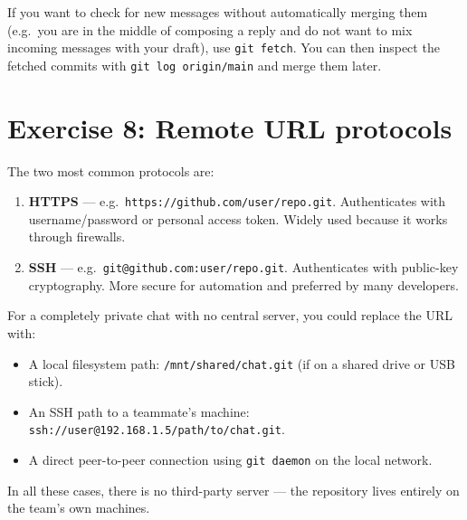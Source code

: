 \documentclass[twoside=false,DIV=14]{scrartcl}
\begin{document}
If you want to check for new messages without automatically merging them (e.g.\ you are in the middle of composing a reply and do not want to mix incoming messages with your draft), use \texttt{git fetch}.  You can then inspect the fetched commits with \texttt{git log origin/main} and merge them later.

\section*{Exercise 8: Remote URL protocols}

The two most common protocols are:

\begin{enumerate}
    \item \textbf{HTTPS} --- e.g.\ \texttt{https://github.com/user/repo.git}.  Authenticates with username/password or personal access token.  Widely used because it works through firewalls.
    \item \textbf{SSH} --- e.g.\ \texttt{git@github.com:user/repo.git}.  Authenticates with public-key cryptography.  More secure for automation and preferred by many developers.
\end{enumerate}

For a completely private chat with no central server, you could replace the URL with:
\begin{itemize}
\item A local filesystem path: \texttt{/mnt/shared/chat.git} (if on a shared drive or USB stick).
\item An SSH path to a teammate's machine: \texttt{ssh://user@192.168.1.5/path/to/chat.git}.
\item A direct peer-to-peer connection using \texttt{git daemon} on the local network.
\end{itemize}
In all these cases, there is no third-party server --- the repository lives entirely on the team's own machines.
\end{document}
